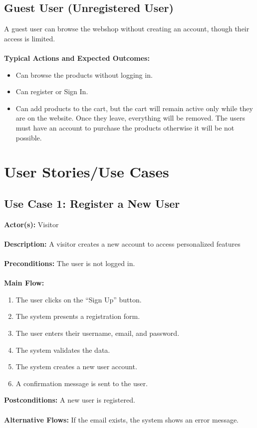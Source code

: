 \documentclass[a4paper,12pt]{article}
\begin{document}
	\subsection*{Guest User (Unregistered User)}
	A guest user can browse the webshop without creating an account, though their access is limited. \\ \\
	\textbf{Typical Actions and Expected Outcomes:}
	\begin{itemize}
		\item Can browse the products without logging in.
		\item Can register or Sign In.
		\item Can add products to the cart, but the cart will remain active only while they are on the website. Once they leave, everything will be removed. The users must have an account to purchase the products otherwise it will be not possible.
	\end{itemize}




	\section{User Stories/Use Cases}




	\subsection*{Use Case 1: Register a New User}
	\textbf{Actor(s):} Visitor \\ \\
	\textbf{Description:} A visitor creates a new account to access personalized features \\ \\
	\textbf{Preconditions:} The user is not logged in. \\ \\
	\textbf{Main Flow:}
	\begin{enumerate}
    		\item The user clicks on the ``Sign Up'' button.
    		\item The system presents a registration form.
    		\item The user enters their username, email, and password.
    		\item The system validates the data.
    		\item The system creates a new user account.
    		\item A confirmation message is sent to the user.
    \end{enumerate}
    \textbf{Postconditions:} A new user is registered. \\ \\
    \textbf{Alternative Flows:} If the email exists, the system shows an error message.
\end{document}
